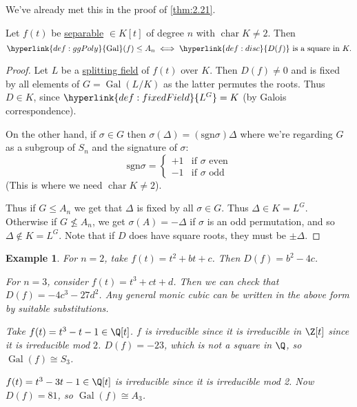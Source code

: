 \documentclass{article}
\DeclareMathOperator{\chara}{char}
\DeclareMathOperator{\Gal}{Gal}
\newtheorem{nexample}[nthm]{Example}
\begin{document}
\begin{remark}
    We've already met this in the proof of \cref{thm:2.21}.
\end{remark}

\begin{nlemma}\label{lem:3.11}
    Let $f(t)$ be \hyperlink{def:separablePoly}{separable} $\in K[t]$ of degree $n$ with $\chara K \neq 2$.
    Then
    \begin{equation*}\hyperlink{def:ggPoly}{\Gal}(f) \leq A_n \iff \hyperlink{def:disc}{D(f)}\text{ is a square in }K.\end{equation*}
\end{nlemma}

\begin{proof}
    Let $L$ be a \hyperlink{def:splitting}{splitting field} of $f(t)$ over $K$.
    Then $D(f) \neq 0$ and is fixed by all elements of $G = \Gal(L/K)$ as the latter permutes the roots.
    Thus $D \in K$, since $\hyperlink{def:fixedField}{L^G} = K$ (by Galois correspondence).

    On the other hand, if $\sigma\in G$ then $\sigma(\Delta) = (\mathrm{sgn} \sigma) \Delta$ where we're regarding $G$ as a subgroup of $S_n$ and the signature of $\sigma$:
    \begin{equation*}
        \mathrm{sgn} \sigma =
        \begin{cases}
            +1 & \text{if $\sigma$ even} \\
            -1 & \text{if $\sigma$ odd}
        \end{cases}
    \end{equation*}
    (This is where we need $\chara K \neq 2$).

    Thus if $G \leq A_n$ we get that $\Delta$ is fixed by all $\sigma \in G$.
    Thus $\Delta \in K = L^G$.
    Otherwise if $G \nleq A_n$, we get $\sigma(A) = -\Delta$ if $\sigma$ is an odd permutation, and so $\Delta \notin K=L^G$.
    Note that if $D$ does have square roots, they must be $\pm \Delta$.
\end{proof}

\begin{nexample}\label{eg:3.12}
    For $n=2$, take $f(t) = t^2 + bt + c$. Then $D(f) = b^2 - 4c$.

    For $n=3$, consider $f(t) = t^3 + ct + d$. Then we can check that $D(f) = -4c^3 - 27d^2$.
    Any general monic cubic can be written in the above form by suitable substitutions.

    Take $f(t) = t^3 - t - 1 \in \Q[t]$. $f$ is irreducible since it is irreducible in $\Z[t]$ since it is irreducible mod $2$.
    $D(f) = -23$, which is not a square in $\Q$, so $\Gal(f) \cong S_3$.

    $f(t) = t^3 - 3t-1 \in \Q[t]$ is irreducible since it is irreducible mod 2. Now $D(f) = 81$, so $\Gal(f) \cong A_3$.
\end{nexample}
\end{document}
